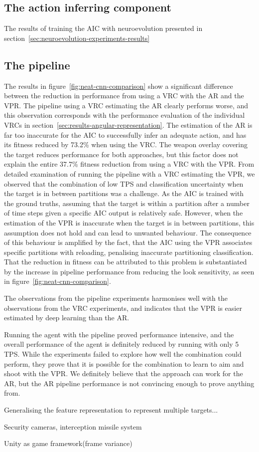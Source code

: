 \subsection{The action inferring component}
The results of training the AIC with neuroevolution presented in section~\ref{sec:neuroevolution-experiments-results} 


\subsection{The pipeline}
The results in figure~\ref{fig:neat-cnn-comparison} show a significant difference between the reduction in performance from using a VRC with the AR and the VPR. The pipeline using a VRC estimating the AR clearly performs worse, and this observation corresponds with the performance evaluation of the individual VRCs in section~\ref{sec:results-angular-representation}. The estimation of the AR is far too inaccurate for the AIC to successfully infer an adequate action, and has its fitness reduced by 73.2\% when using the VRC. The weapon overlay covering the target reduces performance for both approaches, but this factor does not explain the entire 37.7\% fitness reduction from using a VRC with the VPR. From detailed examination of running the pipeline with a VRC estimating the VPR, we observed that the combination of low TPS and classification uncertainty when the target is in between partitions was a challenge. As the AIC is trained with the ground truths, assuming that the target is within a partition after a number of time steps given a specific AIC output is relatively safe. However, when the estimation of the VPR is inaccurate when the target is in between partitions, this assumption does not hold and can lead to unwanted behaviour. The consequence of this behaviour is amplified by the fact, that the AIC using the VPR associates specific partitions with reloading, penalising inaccurate partitioning classification. That the reduction in fitness can be attributed to this problem is substantiated by the increase in pipeline performance from reducing the look sensitivity, as seen in figure~\ref{fig:neat-cnn-comparison}.

The observations from the pipeline experiments harmonises well with the observations from the VRC experiments, and indicates that the VPR is easier estimated by deep learning than the AR.

Running the agent with the pipeline proved performance intensive, and the overall performance of the agent is definitely reduced by running with only 5 TPS. While the experiments failed to explore how well the combination could perform, they prove that it is possible for the combination to learn to aim and shoot with the VPR. We definitely believe that the approach can work for the AR, but the AR pipeline performance is not convincing enough to prove anything from.



Generalising the feature representation to represent multiple targets...

Security cameras, interception missile system

Unity as game framework(frame variance)